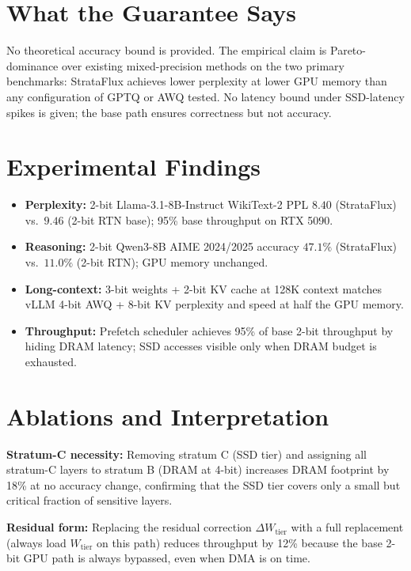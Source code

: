 \documentclass[10pt,twocolumn]{article}
\begin{document}
\section{What the Guarantee Says}

No theoretical accuracy bound is provided. The empirical claim is
Pareto-dominance over existing mixed-precision methods on the two
primary benchmarks: StrataFlux achieves lower perplexity at lower GPU
memory than any configuration of GPTQ or AWQ tested. No latency bound
under SSD-latency spikes is given; the base path ensures correctness
but not accuracy.

\section{Experimental Findings}

\begin{itemize}[itemsep=2pt,parsep=0pt]
  \item \textbf{Perplexity:} 2-bit Llama-3.1-8B-Instruct WikiText-2
    PPL $8.40$ (StrataFlux) vs.\ $9.46$ (2-bit RTN base); 95\% base
    throughput on RTX 5090.
  \item \textbf{Reasoning:} 2-bit Qwen3-8B AIME 2024/2025 accuracy
    $47.1\%$ (StrataFlux) vs.\ $11.0\%$ (2-bit RTN); GPU memory
    unchanged.
  \item \textbf{Long-context:} 3-bit weights + 2-bit KV cache at 128K
    context matches vLLM 4-bit AWQ + 8-bit KV perplexity and speed
    at half the GPU memory.
  \item \textbf{Throughput:} Prefetch scheduler achieves 95\% of base
    2-bit throughput by hiding DRAM latency; SSD accesses visible only
    when DRAM budget is exhausted.
\end{itemize}

\section{Ablations and Interpretation}

\textbf{Stratum-C necessity:} Removing stratum C (SSD tier) and
assigning all stratum-C layers to stratum B (DRAM at 4-bit) increases
DRAM footprint by 18\% at no accuracy change, confirming that the
SSD tier covers only a small but critical fraction of sensitive layers.

\textbf{Residual form:} Replacing the residual correction
$\Delta W_{\text{tier}}$ with a full replacement (always load
$W_{\text{tier}}$ on this path) reduces throughput by 12\% because
the base 2-bit GPU path is always bypassed, even when DMA is on time.
\end{document}
